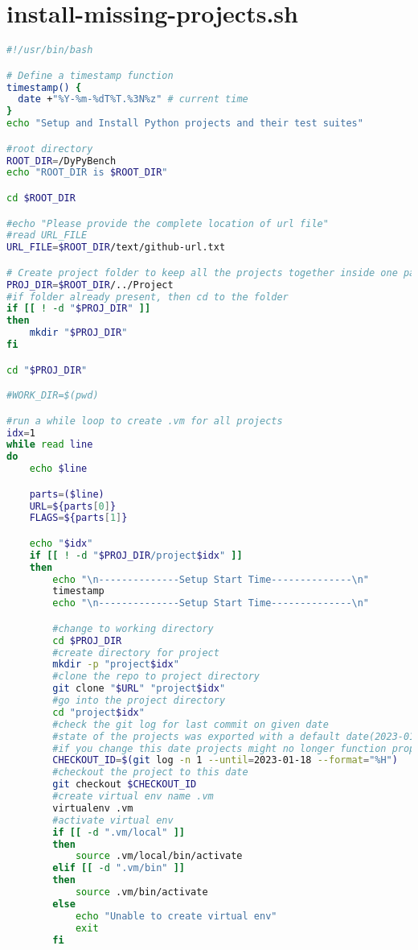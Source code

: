 \section{install-missing-projects.sh}
\lstset{numbers=left, numberstyle=\tiny, stepnumber=1, numbersep=5pt, columns=flexible, breaklines=true, numberblanklines=false}
\lstset{basicstyle=\ttfamily}
\lstset{frame=tb}

\begin{lstlisting}[caption=install-missing-projects.sh,label=code:install-missing-projects.sh,language=Bash]
#!/usr/bin/bash

# Define a timestamp function
timestamp() {
  date +"%Y-%m-%dT%T.%3N%z" # current time
}
echo "Setup and Install Python projects and their test suites"

#root directory
ROOT_DIR=/DyPyBench
echo "ROOT_DIR is $ROOT_DIR"

cd $ROOT_DIR

#echo "Please provide the complete location of url file"
#read URL_FILE
URL_FILE=$ROOT_DIR/text/github-url.txt

# Create project folder to keep all the projects together inside one parent folder
PROJ_DIR=$ROOT_DIR/../Project
#if folder already present, then cd to the folder
if [[ ! -d "$PROJ_DIR" ]]
then
    mkdir "$PROJ_DIR"
fi

cd "$PROJ_DIR"

#WORK_DIR=$(pwd)

#run a while loop to create .vm for all projects
idx=1
while read line
do
    echo $line

    parts=($line)
    URL=${parts[0]}
    FLAGS=${parts[1]}

    echo "$idx"
    if [[ ! -d "$PROJ_DIR/project$idx" ]]
    then
        echo "\n--------------Setup Start Time--------------\n" 
        timestamp
        echo "\n--------------Setup Start Time--------------\n"

        #change to working directory
        cd $PROJ_DIR
        #create directory for project
        mkdir -p "project$idx"
        #clone the repo to project directory
        git clone "$URL" "project$idx"
        #go into the project directory
        cd "project$idx"
        #check the git log for last commit on given date
        #state of the projects was exported with a default date(2023-01-18), 
        #if you change this date projects might no longer function properly due to code changes in the repository.
        CHECKOUT_ID=$(git log -n 1 --until=2023-01-18 --format="%H")
        #checkout the project to this date
        git checkout $CHECKOUT_ID
        #create virtual env name .vm
        virtualenv .vm
        #activate virtual env
        if [[ -d ".vm/local" ]]
        then
            source .vm/local/bin/activate
        elif [[ -d ".vm/bin" ]]
        then
            source .vm/bin/activate
        else
            echo "Unable to create virtual env"
            exit
        fi


\end{lstlisting}

